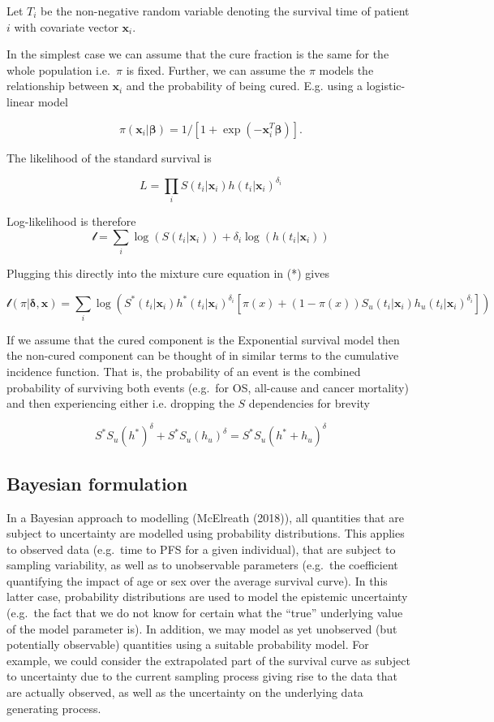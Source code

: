 \documentclass[
]{article}
\begin{document}
Let \(T_i\) be the non-negative random variable denoting the survival
time of patient \(i\) with covariate vector \(\boldsymbol{x}_i\).

In the simplest case we can assume that the cure fraction is the same
for the whole population i.e.~\(\pi\) is fixed. Further, we can assume
the \(\pi\) models the relationship between \(\boldsymbol{x}_i\) and the
probability of being cured. E.g. using a logistic-linear model

\[
\pi(\boldsymbol{x}_i | \boldsymbol{\beta}) = 1/[1 + \exp(-\boldsymbol{x}_i^T \boldsymbol{\beta})].
\]

The likelihood of the standard survival is

\[
L = \prod_i S(t_i | \boldsymbol{x}_i) h(t_i | \boldsymbol{x}_i)^{\delta_i}
\]

Log-likelihood is therefore \[
\mathcal{l} = \sum_i \log(S(t_i | \boldsymbol{x}_i)) + \delta_i \log(h(t_i | \boldsymbol{x}_i))
\]

Plugging this directly into the mixture cure equation in (*) gives

\[
\mathcal{l}(\pi | \boldsymbol{\delta}, \boldsymbol{x}) =
 \sum_i \log(S^*(t_i | \boldsymbol{x}_i) h^*(t_i | \boldsymbol{x}_i)^{\delta_i}[\pi(x) +
   (1 − \pi(x)) S_u(t_i | \boldsymbol{x}_i) h_u(t_i | \boldsymbol{x}_i)^{\delta_i}])
\]

If we assume that the cured component is the Exponential survival model
then the non-cured component can be thought of in similar terms to the
cumulative incidence function. That is, the probability of an event is
the combined probability of surviving both events (e.g.~for OS,
all-cause and cancer mortality) and then experiencing either i.e.
dropping the \(S\) dependencies for brevity

\begin{equation}
\tag{**}
S^* S_u (h^*)^{\delta} + S^* S_u (h_u)^{\delta} = S^* S_u (h^* + h_u)^{\delta}
\end{equation}

\hypertarget{bayesian-formulation}{%
\subsection{Bayesian formulation}\label{bayesian-formulation}}

In a Bayesian approach to modelling (McElreath (2018)), all quantities
that are subject to uncertainty are modelled using probability
distributions. This applies to observed data (e.g.~time to PFS for a
given individual), that are subject to sampling variability, as well as
to unobservable parameters (e.g.~the coefficient quantifying the impact
of age or sex over the average survival curve). In this latter case,
probability distributions are used to model the epistemic uncertainty
(e.g.~the fact that we do not know for certain what the ``true''
underlying value of the model parameter is). In addition, we may model
as yet unobserved (but potentially observable) quantities using a
suitable probability model. For example, we could consider the
extrapolated part of the survival curve as subject to uncertainty due to
the current sampling process giving rise to the data that are actually
observed, as well as the uncertainty on the underlying data generating
process.
\end{document}
